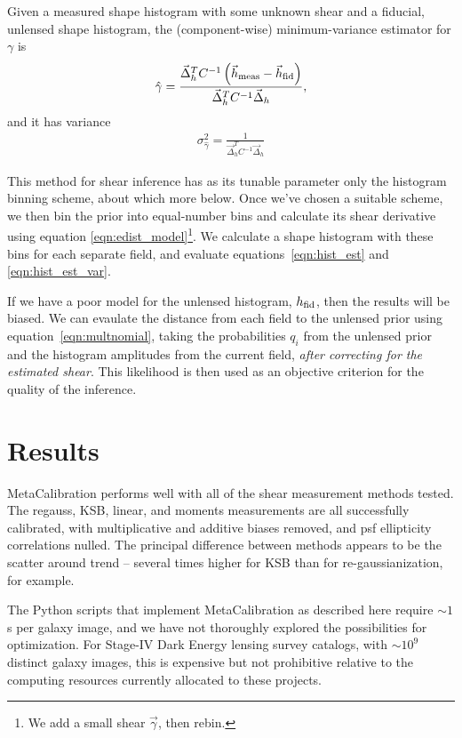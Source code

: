 \documentclass[iop]{emulateapj}
\begin{document}
Given a measured shape histogram with some unknown shear and a fiducial, unlensed shape histogram, the (component-wise) minimum-variance estimator for $\gamma$ is
\begin{align}
\hat{\gamma} = \frac{\vec{\Delta}_h^T C^{-1}\left( \vec{h}_{\rm meas} - \vec{h}_{\rm fid}\right)} {\vec{\Delta}_h^TC^{-1}\vec{\Delta}_h},
\label{eqn:hist_est}
\end{align}
and it has variance
\begin{align}
\sigma^2_{\hat{\gamma}} = \frac{1}{\vec{\Delta}_h^TC^{-1}\vec{\Delta}_h}
\label{eqn:hist_est_var}
\end{align}

This method for shear inference has as its tunable parameter only the histogram binning scheme, about which more below. Once we've chosen a suitable scheme, we then bin the prior into equal-number bins and calculate its shear derivative using equation \ref{eqn:edist_model}\footnote{We add a small shear $\vec{\gamma}$, then rebin.}. We calculate a shape histogram with these bins for each separate field, and evaluate equations~\ref{eqn:hist_est} and \ref{eqn:hist_est_var}.

If we have a poor model for the unlensed histogram, $h_{\rm fid}$, then the results will be biased. We can evaulate the distance from each field to the unlensed prior using equation~\ref{eqn:multnomial}, taking the probabilities $q_i$ from the unlensed prior and the histogram amplitudes from the current field, {\it after correcting for the estimated shear}. This likelihood is then used as an objective criterion for the quality of the inference.

\section{Results}

MetaCalibration performs well with all of the shear measurement methods tested. The regauss, KSB, linear, and moments measurements are all successfully calibrated, with multiplicative and additive biases removed, and psf ellipticity correlations nulled. The principal difference between methods appears to be the scatter around trend -- several times higher for KSB than for re-gaussianization, for example.

The Python scripts that implement MetaCalibration as described here require $\sim1$s per galaxy image, and we have not thoroughly explored the possibilities for optimization. For Stage-IV Dark Energy lensing survey catalogs, with $\sim10^9$ distinct galaxy images, this is expensive but not prohibitive relative to the computing resources currently allocated to these projects.







\end{document}
